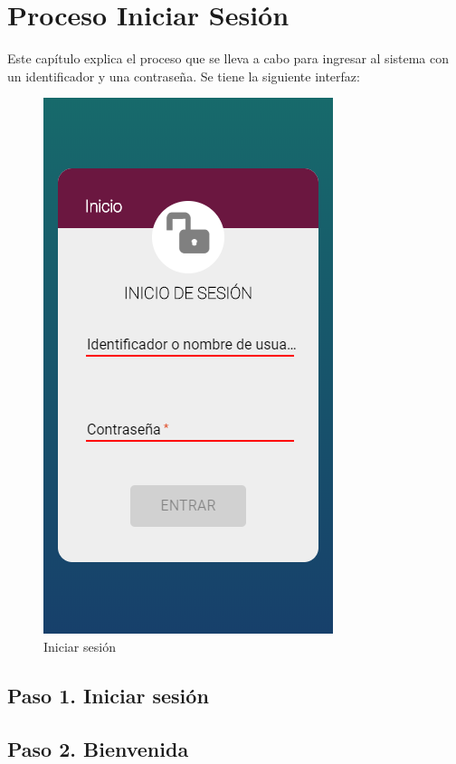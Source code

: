 \chapter{Proceso Iniciar Sesión}
	Este capítulo explica el proceso que se lleva a cabo para ingresar al 
	sistema con un identificador y una contraseña. 
	Se tiene la siguiente interfaz:
	
	\begin{figure}[hbtp]
		
		\includegraphics[scale=0.5]{images/InterfazMovil/IUGS00_login.png}
		\caption{Iniciar sesión}
	\end{figure}


\section{Paso 1. Iniciar sesión}
	

\section{Paso 2. Bienvenida}
	